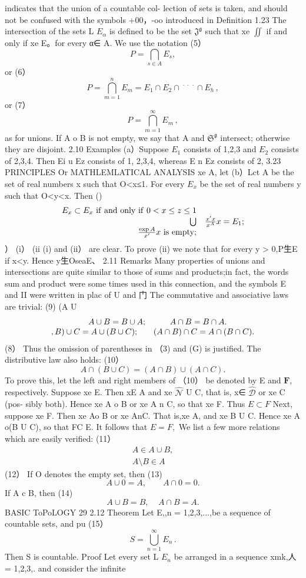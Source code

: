 indicates that the union of a countable col- lection of sets is taken, and should not be confused with the symbols +00，-oo introduced in Definition 1.23 The intersection of the sets L $E_{\alpha}$ is defined to be the set ${\mathfrak{J}}^{\mathfrak{g}}$ such that xe $\textstyle{\iint}$ if and only if xe E。for every α∈ A. We use the notation (5） $$ P=\bigcap_{s\in A}E_{s}, $$ or (6） $$ P=\bigcap_{m=1}^{n}E_{m}=E_{1}\cap E_{2}\cap\ ^{\cdot\;\cdot\;\cdot}\cap E_{h}\,, $$ or (7） $$ P=\bigcap_{m=1}^{\infty}E_{m}\,, $$ as for unions. If A o B is not empty, we say that A and ${\mathfrak{S}}^{\mathfrak{g}}$ intersect; otherwise they are disjoint. 2.10 Examples (a）Suppose $E_{1}$ consists of 1,2,3 and $E_{2}$ consists of 2,3,4. Then Ei u Ez consists of 1, 2,3,4, whereas E n Ez consists of 2, 3.23 PRINCIPLES Or MATHLEMLATICAL ANALYSIS xe A, let (b）Lct A be the set of real numbers x such that O<x≤1. For every $E_{x}$ be the set of real numbers y such that O<y<x. Then () $$ \begin{array}{r l}{E_{x}\subset E_{x}{\mathrm{~if~and~only~if~}}0<x\leq z\leq1}\\ {\bigcup}&{{}{\frac{x^{\prime}x}{x^{A}}}x=E_{1};}\\ {\qquad{\frac{\exp A}{x^{\prime}}}x{\mathrm{~is~empty}};}\end{array} $$ ） (i） (ii (i) and (ii） are clear. To prove (ii) we note that for every y > 0,P生E if x<y. Hence y生OseaE、 2.11 Remarks Many properties of unions and intersections are quite similar to those of sums and products;in fact, the words sum and product were some times used in this connection, and the symbols E and II were written in plac of U and 门 The commutative and associative laws are trivial: (9) (A U $$ \begin{array}{r l}{A\cup B=B\cup A;}&{{}\qquad A\cap B=B\cap A.}\\ {,B)\cup C=A\cup(B\cup C);\quad}&{{}(A\cap B)\cap C=A\cap(B\cap C).}\end{array} $$ (8） Thus the omission of parentheses in （3) and (G) is justified. The distributive law also holds: (10） $$ A\cap(B\cup C)=(A\cap B)\cup(A\cap C). $$ To prove this, let the left and right members of （10） be denoted by E and ${\boldsymbol{F}},$ respectively. Suppose xe E. Then xE A and xe ${\hat{\mathcal{N}}}$ U C, that is, x∈ ${\hat{\mathcal{D}}}$ or xe C (pos- sibly both). Hence xe A o B or xe A n C, so that xe F. Thus $E\subset F$ Next, suppose xe F. Then xe Ao B or xe AnC. That is,xe A, and xe B U C. Hence xe A o(B U C), so that FC E. It follows that $E=F,$ We list a few more relations which are easily verified: (11） $$ \begin{array}{c}{{A\in A\cup B,}}\\ {{A\setminus B\in A}}\end{array} $$ (12） If O denotes the empty set, then (13) $$ A\cup0=A,\qquad A\cap0=0. $$ If A c B, then (14) $$ A\cup B=B,\ \ \ \ \ A\cap B=A. $$BASIC ToPoLOGY 29 2.12 Theorem Let {E,},n = 1,2,3,...,be a sequence of countable sets, and pu (15） $$ S=\bigcup_{n=1}^{\infty}E_{n}\,. $$ Then S is countable. Proof Let every set L $E_{n}$ be arranged in a sequence {xmk},人 = 1,2,3,. and consider the infinite 